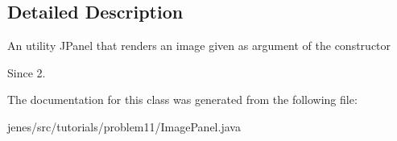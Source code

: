 \subsection{Detailed Description}
An utility J\-Panel that renders an image given as argument of the constructor

\begin{DoxySince}{Since}
2. 
\end{DoxySince}


The documentation for this class was generated from the following file\-:\begin{DoxyCompactItemize}
\item 
jenes/src/tutorials/problem11/Image\-Panel.\-java\end{DoxyCompactItemize}
